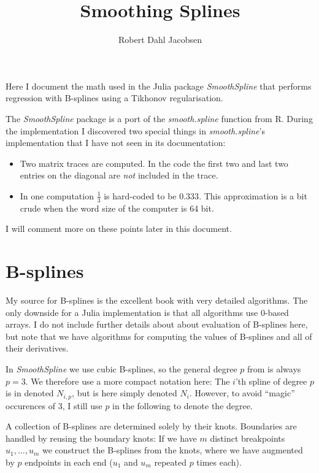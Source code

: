 \documentclass[a4paper]{scrartcl}
\title{Smoothing Splines}
\author{Robert Dahl Jacobsen}
\begin{document}
\maketitle

Here I document the math used in the Julia package \textit{SmoothSpline} that performs regression with B-splines using a Tikhonov regularisation.

The \textit{SmoothSpline} package is a port of the \textit{smooth.spline} function from R.
During the implementation I discovered two special things in \textit{smooth.spline}'s implementation that I have not seen in its documentation:

\begin{itemize}
    \item Two matrix traces are computed. In the code the first two and last two entries on the diagonal are \emph{not} included in the trace. 
    \item In one computation $\tfrac13$ is hard-coded to be $0.333$. This approximation is a bit crude when the word size of the computer is 64 bit.
\end{itemize}

I will comment more on these points later in this document.


\section{B-splines}
\label{sec:bsplines}

My source for B-splines is the excellent book \cite{Piegl:Tiller:1997} with very detailed algorithms.
The only downside for a Julia implementation is that all algorithms use 0-based arrays.
I do not include further details about about evaluation of B-splines here, but note that we have algorithms for computing the values of B-splines and all of their derivatives.


In \textit{SmoothSpline} we use cubic B-splines, so the general degree $p$ from \cite{Piegl:Tiller:1997} is always $p = 3$.
We therefore use a more compact notation here:
The $i$'th spline of degree $p$ is in \cite{Piegl:Tiller:1997} denoted $N_{i,p}$, but is here simply denoted $N_i$.
However, to avoid \enquote{magic} occurences of 3, I still use $p$ in the following to denote the degree.

A collection of B-splines are determined solely by their knots.
Boundaries are handled by reusing the boundary knots:
If we have $m$ distinct breakpoints $u_1, \ldots, u_m$ we construct the B-splines from the knots, where we have augmented by $p$ endpoints in each end ($u_1$ and $u_m$ repeated $p$ times each).
\end{document}
